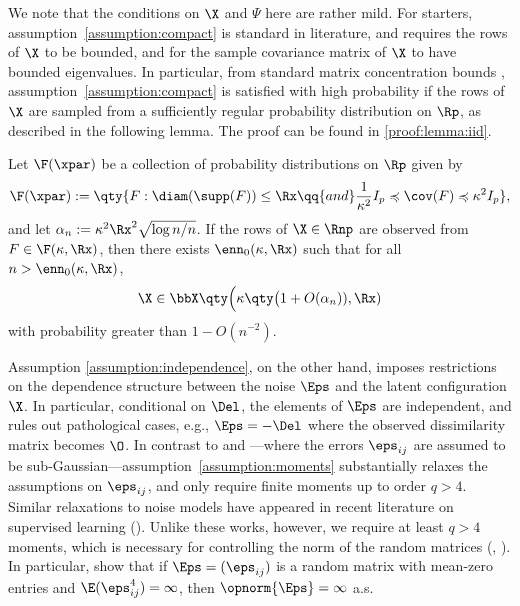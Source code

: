 \documentclass[10pt]{article}
\begin{document}
{
We note that the conditions on $\X$ and $\Psi$ here are rather mild. For starters, assumption~\ref{assumption:compact} is standard in literature, and requires the rows of $\X$ to be bounded, and for the sample covariance matrix of $\X$ to have bounded eigenvalues. In particular, from standard matrix concentration bounds \citep[e.g.,][]{vershynin2018high}, assumption~\ref{assumption:compact} is satisfied with high probability if the rows of $\X$ are sampled \iid{} from a sufficiently regular probability distribution on $\Rp$, as described in the following lemma. The proof can be found in \cref{proof:lemma:iid}.

\begin{lemma}\label{lemma:iid}
    Let $\F(\xpar)$ be a collection of probability distributions on $\Rp$ given by
    \begin{align}
        \F(\xpar) := \qty{ F : \diam(\supp(F)) \le \Rx \qq{and} \frac{1}{\kappa^2}I_p \preccurlyeq \cov(F) \preccurlyeq \kappa^2 I_p },\label{eq:F}
    \end{align}
    and let $\alpha_n := \kappa^2\Rx^2\sqrt{\log{n}/n}$. If the rows of $\X \in \Rnp$ are observed \iid{} from $F \in \F(\kappa, \Rx)$, then there exists $\enn_0(\kappa, \Rx)$ such that for all $n > \enn_0(\kappa, \Rx)$,
    $$
    \X \in \bbX\qty\Big( \kappa\qty\big(1 + O(\alpha_n) ), \Rx)
    $$
    with probability greater than $1 - O(n^{-2})$.
\end{lemma}

Assumption \ref{assumption:independence}, on the other hand, imposes restrictions on the dependence structure between the noise $\Eps$ and the latent configuration $\X$. In particular, conditional on $\Del$, the elements of $\Eps$ are independent, and rules out pathological cases, e.g., $\Eps = -\Del$ where the observed dissimilarity matrix becomes $\O$. In contrast to \cite{li2020central} and \cite{little2023analysis}---where the errors $\eps_{ij}$ are assumed to be sub-Gaussian---assumption~{\ref{assumption:moments}} substantially relaxes the assumptions on $\eps_{ij}$, and only require finite moments up to order $q > 4$. Similar relaxations to noise models have appeared in recent literature on supervised learning (\citealp[e.g.,][]{kuchibhotla2022least,kuchibhotla2022moving,bakhshizadeh2023sharp}). Unlike these works, however, we require at least $q > 4$ moments, which is necessary for controlling the norm of the random matrices (\citealp{bai1988note}, \citealp{silverstein1989weak}). In particular, \cite{bai1988note} show that if $\Eps = (\eps_{ij})$ is a random matrix with mean-zero \iid{} entries and $\E(\eps_{ij}^4) = \infty$, then $\opnorm{\Eps} = \infty$ a.s. 

}
\end{document}
